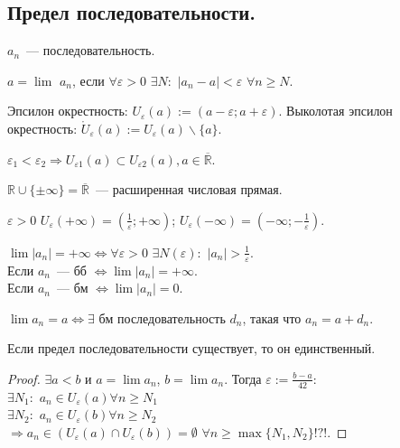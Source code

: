 \documentclass{article}
\begin{document}
	\subsection{Предел последовательности.}
	$a_n$~--- последовательность.
	\begin{definition}
		$a = \lim$ $a_n$, если $\forall \varepsilon > 0$ $\exists N:$ $|a_n - a| < \varepsilon$ $\forall n \geqslant N$.
	\end{definition}
	\begin{definition}
		Эпсилон окрестность: $U_{\varepsilon} (a) := (a - \varepsilon; a + \varepsilon)$. Выколотая эпсилон окрестность: $\mathring{U}_{\varepsilon} (a) := U_{\varepsilon}(a) \backslash \{a\}$.
	\end{definition}
	\noindent
	$\varepsilon_1 < \varepsilon_2 \Rightarrow U_{\varepsilon1}(a) \subset U_{\varepsilon2}(a), a \in \overline{\mathbb{R}}$.
	\begin{definition}
		$\mathbb{R} \cup \{\pm \infty\} = \overline{\mathbb{R}}$~--- расширенная числовая прямая.
	\end{definition}
	\begin{definition}
		$\varepsilon > 0$ $U_{\varepsilon} (+ \infty) = (\frac{1}{\varepsilon}; + \infty)$; $U_{\varepsilon}(- \infty) = (- \infty; -\frac{1}{\varepsilon})$.
	\end{definition}
	\noindent
	$\lim |a_n| = + \infty \Leftrightarrow \forall \varepsilon > 0$ $\exists N(\varepsilon):$ $|a_n| > \frac{1}{\varepsilon}$. \\
	Если $a_n$~--- бб $\Leftrightarrow \lim |a_n| = + \infty$. \\
	Если $a_n$~--- бм $\Leftrightarrow \lim |a_n| = 0$.
	\begin{statement}
		$\lim a_n = a \Leftrightarrow \exists$ бм последовательность $d_n$, такая что $a_n = a + d_n$.
	\end{statement}
	\begin{statement}
		Если предел последовательности существует, то он единственный.
	\end{statement}
	\begin{proof}
		$\exists a < b$ и $a = \lim a_n$, $b = \lim a_n$. Тогда $\varepsilon := \frac{b - a}{42}:$ \\
		$\exists N_1:$ $a_n \in U_{\varepsilon} (a) \forall n \geqslant N_1$ \\
		$\exists N_2:$ $a_n \in U_{\varepsilon} (b) \forall n \geqslant N_2$ \\
		$\Rightarrow a_n \in (U_{\varepsilon} (a) \cap U_{\varepsilon} (b)) = \emptyset$ $\forall n \geqslant \max\{N_1, N_2\} !?!$.
	\end{proof}
\end{document}
